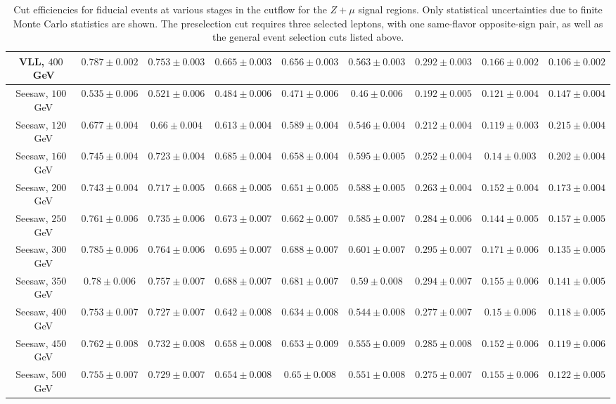 \begin{table}[ht]
{\begin{tabular}{|c|c|c|c|c|c||c|c|c|}
		\hline
		VLL, $400$~GeV	&	$0.787 \pm 0.002$	&	$0.753 \pm 0.003$	&	$0.665 \pm 0.003$	&	$0.656 \pm 0.003$	&	$0.563 \pm 0.003$	&	$0.292 \pm 0.003$ &	$0.166 \pm 0.002$	&	$0.106 \pm 0.002$\\
		\hline
		Seesaw, $100$~GeV	&	$0.535 \pm 0.006$	&	$0.521 \pm 0.006$	&	$0.484 \pm 0.006$	&	$0.471 \pm 0.006$	&	$0.46 \pm 0.006$	&	$0.192 \pm 0.005$ &	$0.121 \pm 0.004$	&	$0.147 \pm 0.004$\\
		\hline
		Seesaw, $120$~GeV	&	$0.677 \pm 0.004$	&	$0.66 \pm 0.004$	&	$0.613 \pm 0.004$	&	$0.589 \pm 0.004$	&	$0.546 \pm 0.004$	&	$0.212 \pm 0.004$ &	$0.119 \pm 0.003$	&	$0.215 \pm 0.004$\\
		\hline
		Seesaw, $160$~GeV	&	$0.745 \pm 0.004$	&	$0.723 \pm 0.004$	&	$0.685 \pm 0.004$	&	$0.658 \pm 0.004$	&	$0.595 \pm 0.005$	&	$0.252 \pm 0.004$ &	$0.14 \pm 0.003$	&	$0.202 \pm 0.004$\\
		\hline
		Seesaw, $200$~GeV	&	$0.743 \pm 0.004$	&	$0.717 \pm 0.005$	&	$0.668 \pm 0.005$	&	$0.651 \pm 0.005$	&	$0.588 \pm 0.005$	&	$0.263 \pm 0.004$ &	$0.152 \pm 0.004$	&	$0.173 \pm 0.004$\\
		\hline
		Seesaw, $250$~GeV	&	$0.761 \pm 0.006$	&	$0.735 \pm 0.006$	&	$0.673 \pm 0.007$	&	$0.662 \pm 0.007$	&	$0.585 \pm 0.007$	&	$0.284 \pm 0.006$ &	$0.144 \pm 0.005$	&	$0.157 \pm 0.005$\\
		\hline
		Seesaw, $300$~GeV	&	$0.785 \pm 0.006$	&	$0.764 \pm 0.006$	&	$0.695 \pm 0.007$	&	$0.688 \pm 0.007$	&	$0.601 \pm 0.007$	&	$0.295 \pm 0.007$ &	$0.171 \pm 0.006$	&	$0.135 \pm 0.005$\\
		\hline
		Seesaw, $350$~GeV	&	$0.78 \pm 0.006$	&	$0.757 \pm 0.007$	&	$0.688 \pm 0.007$	&	$0.681 \pm 0.007$	&	$0.59 \pm 0.008$	&	$0.294 \pm 0.007$ &	$0.155 \pm 0.006$	&	$0.141 \pm 0.005$\\
		\hline
		Seesaw, $400$~GeV	&	$0.753 \pm 0.007$	&	$0.727 \pm 0.007$	&	$0.642 \pm 0.008$	&	$0.634 \pm 0.008$	&	$0.544 \pm 0.008$	&	$0.277 \pm 0.007$ &	$0.15 \pm 0.006$	&	$0.118 \pm 0.005$\\
		\hline
		Seesaw, $450$~GeV	&	$0.762 \pm 0.008$	&	$0.732 \pm 0.008$	&	$0.658 \pm 0.008$	&	$0.653 \pm 0.009$	&	$0.555 \pm 0.009$	&	$0.285 \pm 0.008$ &	$0.152 \pm 0.006$	&	$0.119 \pm 0.006$\\
		\hline
		Seesaw, $500$~GeV	&	$0.755 \pm 0.007$	&	$0.729 \pm 0.007$	&	$0.654 \pm 0.008$	&	$0.65 \pm 0.008$	&	$0.551 \pm 0.008$	&	$0.275 \pm 0.007$ &	$0.155 \pm 0.006$	&	$0.122 \pm 0.005$\\
		\hline
	\end{tabular}
	}
	\caption{Cut efficiencies for fiducial events at various stages in the cutflow for the $Z+\mu$ signal regions. Only statistical uncertainties due to finite Monte Carlo statistics are shown. The preselection cut requires three selected leptons, with one same-flavor opposite-sign pair, as well as the general event selection cuts listed above.}
	\label{table:fiducial-efficiencies-Zmu}
\end{table}

